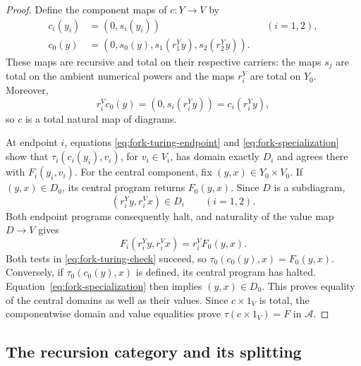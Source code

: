 \documentclass[11pt]{article}
\begin{document}
\begin{proof}
Define the component maps of $c:Y\to V$ by
\begin{align*}
 c_i(y_i)&=(0,s_i(y_i)) &&(i=1,2),\\
 c_0(y)&=(0,s_0(y),s_1(r_1^Yy),s_2(r_2^Yy)).
\end{align*}
These maps are recursive and total on their respective carriers:
the maps $s_j$ are total on the ambient numerical powers and the
maps $r_i^Y$ are total on $Y_0$. Moreover,
\[
 r_i^Vc_0(y)=(0,s_i(r_i^Yy))=c_i(r_i^Yy),
\]
so $c$ is a total natural map of diagrams.

At endpoint $i$, equations
\eqref{eq:fork-turing-endpoint} and
\eqref{eq:fork-specialization} show that
$\tau_i(c_i(y_i),v_i)$, for $v_i\in V_i$, has domain exactly
$D_i$ and agrees there with $F_i(y_i,v_i)$.
For the central component, fix $(y,x)\in Y_0\times V_0$.
If $(y,x)\in D_0$, its central program returns $F_0(y,x)$.
Since $D$ is a subdiagram,
\[
 (r_i^Yy,r_i^Vx)\in D_i\qquad(i=1,2).
\]
Both endpoint programs consequently halt, and naturality of
the value map $D\to V$ gives
\[
 F_i(r_i^Yy,r_i^Vx)=r_i^VF_0(y,x).
\]
Both tests in \eqref{eq:fork-turing-check} succeed, so
$\tau_0(c_0(y),x)=F_0(y,x)$.
Conversely, if $\tau_0(c_0(y),x)$ is defined, its central
program has halted. Equation~\eqref{eq:fork-specialization}
then implies $(y,x)\in D_0$.
This proves equality of the central domains as well as their
values. Since $c\times1_V$ is total, the componentwise domain
and value equalities prove $\tau(c\times1_V)=F$ in $\mathcal A$.
\end{proof}

\subsection{The recursion category and its splitting}
\end{document}
